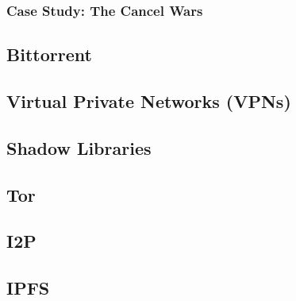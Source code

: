 \subsubsection{Case Study: The Cancel Wars}


\cite{HowUseUsenet,ohmRegulatingInternetUsenet1998}

\subsection{Bittorrent}

\subsection{Virtual Private Networks (VPNs)}

\subsection{Shadow Libraries}

\subsection{Tor}
\subsection{I2P}

\subsection{IPFS}
